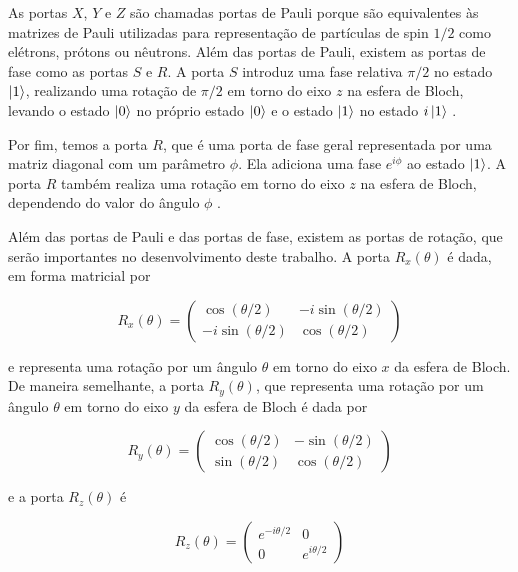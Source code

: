As portas $X$, $Y$ e $Z$ são chamadas portas de Pauli porque são equivalentes às matrizes de Pauli utilizadas para representação de partículas de spin $1/2$ como elétrons, prótons ou nêutrons. Além das portas de Pauli, existem as portas de fase como as portas $S$ e $R$. A porta $S$ introduz uma fase relativa $\pi/2$ no estado $\ket{1}$, realizando uma rotação de $\pi/2$ em torno do eixo $z$ na esfera de Bloch, levando o estado $\ket{0}$ no próprio estado $\ket{0}$ e o estado $\ket{1}$ no estado $i\ket{1}$ \cite{Nielsen}.

Por fim, temos a porta $R$, que é uma porta de fase geral representada por uma matriz diagonal com um parâmetro $\phi$. Ela adiciona uma fase $e^{i\phi}$ ao estado $\ket{1}$. A porta $R$ também realiza uma rotação em torno do eixo $z$ na esfera de Bloch, dependendo do valor do ângulo $\phi$ \cite{Nielsen}.

Além das portas de Pauli e das portas de fase, existem as portas de rotação, que serão importantes no desenvolvimento deste trabalho. A porta $R_x(\theta)$ é dada, em forma matricial por

\begin{center}
\begin{equation}
R_x(\theta) =
\begin{pmatrix}
\cos(\theta/2) & -i\sin(\theta/2) \\
-i\sin(\theta/2) & \cos(\theta/2)
\end{pmatrix}
\end{equation}
\end{center}

\noindent e representa uma rotação por um ângulo $\theta$ em torno do eixo $x$ da esfera de Bloch. De maneira semelhante, a porta $R_y(\theta)$, que representa uma rotação por um ângulo $\theta$ em torno do eixo $y$ da esfera de Bloch é dada por

\begin{center}
\begin{equation}
R_y(\theta) =
\begin{pmatrix}
\cos(\theta/2) & -\sin(\theta/2) \\
\sin(\theta/2) & \cos(\theta/2)
\end{pmatrix}
\end{equation}
\end{center}

\noindent e a porta $R_z(\theta)$ é 

\begin{center}
\begin{equation}
R_z(\theta) =
\begin{pmatrix}
e^{-i\theta/2} & 0            \\
0              & e^{i\theta/2}
\end{pmatrix}
\end{equation}
\end{center}

